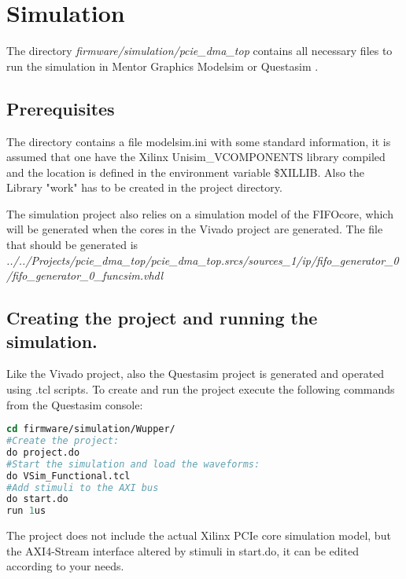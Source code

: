 \section{Simulation}
The directory \textit{firmware/simulation/pcie\_dma\_top} contains all necessary files to run the simulation in Mentor Graphics Modelsim or Questasim \cite{questasim}. 

\subsection{Prerequisites}
The directory contains a file modelsim.ini with some standard information, it is assumed that one have the Xilinx Unisim\_VCOMPONENTS library compiled and the location is defined in the environment variable \$XILLIB. Also the Library "work" has to be created in the project directory.

The simulation project also relies on a simulation model of the FIFOcore, which will be generated when the cores in the Vivado project are generated. The file that should be generated is \textit{../../Projects/pcie\_dma\_top/pcie\_dma\_top.srcs/sources\_1/ip/fifo\_generator\_0 /fifo\_generator\_0\_funcsim.vhdl}

\subsection{Creating the project and running the simulation.}
Like the Vivado project, also the Questasim project is generated and operated using .tcl scripts. To create and run the project execute the following commands from the Questasim console:
\begin{lstlisting}[language=tcl, frame=single, caption=Run the simulation]
cd firmware/simulation/Wupper/
#Create the project:
do project.do
#Start the simulation and load the waveforms:
do VSim_Functional.tcl
#Add stimuli to the AXI bus
do start.do
run 1us
\end{lstlisting}
The project does not include the actual Xilinx PCIe core simulation model, but the AXI4-Stream interface altered by stimuli in start.do, it can be edited according to your needs.
\newpage